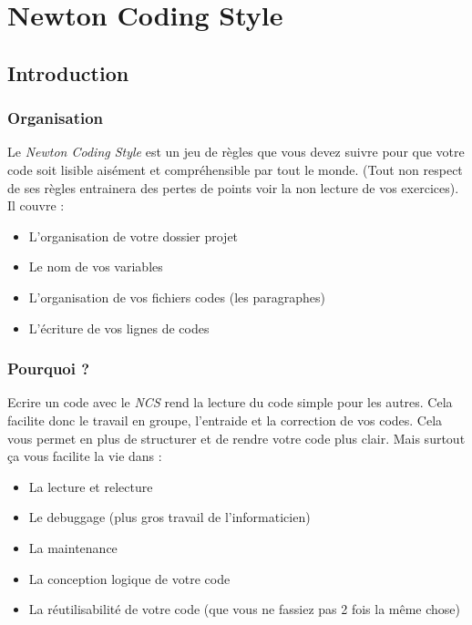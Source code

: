 \documentclass[12pt,fleqn]{report}
\begin{document}
\chapter*{Newton Coding Style}
\section{Introduction}
\subsection{Organisation}
Le \emph{Newton Coding Style} est un jeu de règles que vous devez suivre pour que votre code soit lisible aisément et compréhensible par tout le monde. (Tout non respect de ses règles entrainera des pertes de points voir la non lecture de vos exercices). \\
Il couvre : 
\begin{itemize}
    \item L'organisation de votre dossier projet
    \item Le nom de vos variables
    \item L'organisation de vos fichiers codes (les paragraphes)
    \item L'écriture de vos lignes de codes
\end{itemize}
\subsection{Pourquoi ?}
Ecrire un code avec le \emph{NCS} rend la lecture du code simple pour les autres. Cela facilite donc le travail en groupe, l'entraide et la correction de vos codes. Cela vous permet en plus de structurer et de rendre votre code plus clair. Mais surtout ça vous facilite la vie dans :
\begin{itemize}
    \item La lecture et relecture
    \item Le debuggage (plus gros travail de l'informaticien)
    \item La maintenance
    \item La conception logique de votre code
    \item La réutilisabilité de votre code (que vous ne fassiez pas 2 fois la même chose)
\end{itemize}
\end{document}
